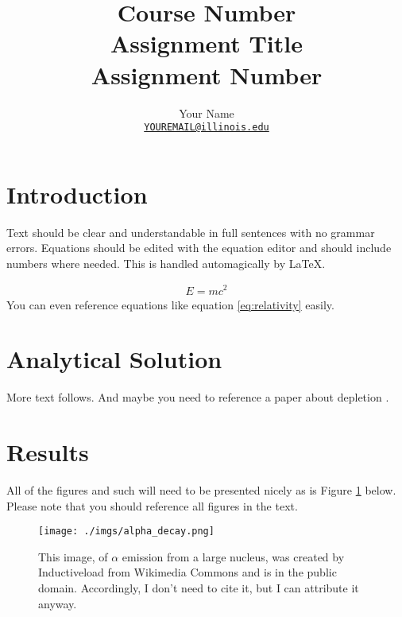 \documentclass[letterpaper]{article}
\author{Your Name
        \\ \href{mailto:YOUREMAIL@illinois.edu}{\texttt{YOUREMAIL@illinois.edu}}
}
\title{Course Number\\
Assignment Title\\
Assignment Number}
\begin{document}
\begin{titlepage}
\maketitle
\thispagestyle{empty}
\end{titlepage}

\section{Introduction}
Text should be clear and understandable in full sentences with no grammar errors. Equations should be edited with the equation editor and should include numbers where needed. This is handled automagically by \LaTeX. 

\begin{align}
E=mc^2\label{eq:relativity}
\end{align}
You can even reference equations like equation \ref{eq:relativity} easily.

\section{Analytical Solution}

More text follows. And maybe you need to reference a paper about depletion \cite{gauld_isotopic_2011}.

\section{Results}
All of the figures and such will need to be presented nicely as is Figure 
\ref{fig:alpha} below. Please note that you should reference all figures in the 
text.

\begin{figure}[htbp!]
        \begin{center}
                \texttt{[image: ./imgs/alpha\_decay.png]}
        \end{center}
        \caption{This image, of $\alpha$ emission from a large nucleus,  was 
        created by Inductiveload from Wikimedia Commons and is in the public 
        domain. Accordingly, I don't need to cite it, but I can attribute it anyway.}
        \label{fig:alpha}
\end{figure}


\pagebreak


\end{document}
